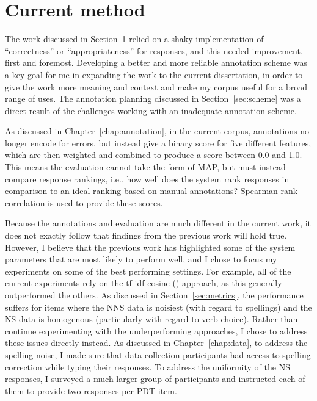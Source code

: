 \section{Current method}
\label{sec:current-method}
The work discussed in Section~\ref{sec:current-method} relied on a shaky implementation of ``correctness'' or ``appropriateness'' for responses, and this needed improvement, first and foremost. Developing a better and more reliable annotation scheme was a key goal for me in expanding the work to the current dissertation, in order to give the work more meaning and context and make my corpus useful for a broad range of uses. The annotation planning discussed in Section~\ref{sec:scheme} was a direct result of the challenges working with an inadequate annotation scheme. 

As discussed in Chapter~\ref{chap:annotation}, in the current corpus, annotations no longer encode for errors, but instead give a binary score for five different features, which are then weighted and combined to produce a score between 0.0 and 1.0. This means the evaluation cannot take the form of MAP, but must instead compare response rankings, i.e., how well does the system rank responses in comparison to an ideal ranking based on manual annotations? Spearman rank correlation is used to provide these scores.

Because the annotations and evaluation are much different in the current work, it does not exactly follow that findings from the previous work will hold true. However, I believe that the previous work has highlighted some of the system parameters that are most likely to perform well, and I chose to focus my experiments on some of the best performing settings. For example, all of the current experiments rely on the tf-idf cosine () approach, as this generally outperformed the others. As discussed in Section~\ref{sec:metrics}, the  performance suffers for items where the NNS data is noisiest (with regard to spellings) and the NS data is homogenous (particularly with regard to verb choice). Rather than continue experimenting with the underperforming approaches, I chose to address these issues directly instead. As discussed in Chapter~\ref{chap:data}, to address the spelling noise, I made sure that data collection participants had access to spelling correction while typing their responses. To address the uniformity of the NS responses, I surveyed a much larger group of participants and instructed each of them to provide two responses per PDT item.


